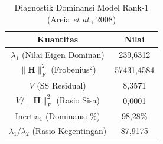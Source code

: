 \begin{table}[H]
\centering
\small
\caption{Diagnostik Dominansi Model Rank-1 (Areia \textit{et al.}, 2008)} \label{tab:app2struktur_diagnostik}
\begin{tabular}{|c|c|}
\hline
\textbf{Kuantitas} & \textbf{Nilai} \\
\hline
$\lambda_1$ (Nilai Eigen Dominan) & 239,6312 \\
$\|\mathbf{H}\|_F^2$ (Frobenius$^2$) & 57431,4584 \\
$V$ (SS Residual) & 8,3571 \\
$V / \|\mathbf{H}\|_F^2$ (Rasio Sisa) & 0,0001 \\
Inertia$_1$ (Dominansi \%) & 98,28\% \\
$\lambda_1 / \lambda_2$ (Rasio Kegentingan) & 87,9175 \\
\hline
\end{tabular}
\end{table}
